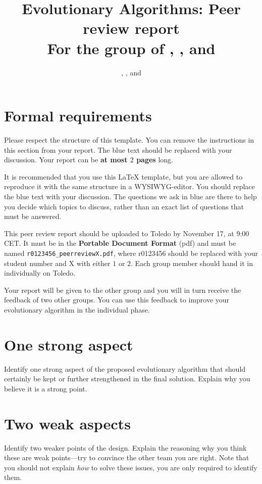 \documentclass[a4paper,10pt]{article}
\title{\vspace{-2cm}Evolutionary Algorithms: Peer review report\\ {\large For the group of \ReplaceMe{Other group member 1}, \ReplaceMe{Other group member 2}, and \ReplaceMe{Other group member 3}}}
\author{\ReplaceMe{Group Member 1}, \ReplaceMe{Group Member 2}, and \ReplaceMe{Group Member 3}}
\newcommand{\thisyear}{\the\year}
\newcommand{\deadlinePeer}{November 17, \thisyear{} at 9:00 CET}
\newcommand{\ReplaceMe}[1]{{\color{blue}#1}}
\newcommand{\RemoveMe}[1]{{\color{purple}#1}}
\begin{document}
\selectfont{}

\maketitle

\RemoveMe{
\section*{Formal requirements}

Please respect the structure of this template. You can remove the instructions in this section from your report. The blue text should be replaced with your discussion. Your report can be \textbf{at most $2$ pages} long. 

It is recommended that you use this \LaTeX{} template, but you are allowed to reproduce it with the same structure in a WYSIWYG-editor. You should replace the blue text with your discussion. The questions we ask in blue are there to help you decide which topics to discuss, rather than an exact list of questions that must be answered.

This peer review report should be uploaded to Toledo by \deadlinePeer. It must be in the \textbf{Portable Document Format} (pdf) and must be named \texttt{r0123456\_peerreviewX.pdf}, where r0123456 should be replaced with your student number and X with either $1$ or $2$. Each group member should hand it in individually on Toledo.

Your report will be given to the other group and you will in turn receive the feedback of two other groups. You can use this feedback to improve your evolutionary algorithm in the individual phase.
}

\section{One strong aspect}

\ReplaceMe{Identify one strong aspect of the proposed evolutionary algorithm that should certainly be kept or further strengthened in the final solution. Explain why you believe it is a strong point.}

\section{Two weak aspects} 

\ReplaceMe{Identify two weaker points of the design. Explain the reasoning why you think these are weak points---try to convince the other team you are right. Note that you should not explain \textit{how} to solve these issues, you are only required to identify them.}
\end{document}
